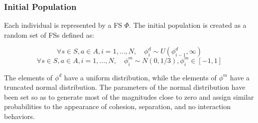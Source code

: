 \documentclass{llncs}
\begin{document}
\subsubsection{Initial Population}
\label{par:GA_Initial}
Each individual is represented by a FS $\Phi$. The initial population is created as a random set of FSs defined as:
\begin{small}
\begin{equation}
	\label{eq:init_dist}
	\forall s \in S, a \in A,  i = 1, \ldots, N, \quad \phi^d_i \sim U(\phi^d_{i-1},\infty)
\end{equation}
\begin{equation}
	\label{eq:init_magn}
	\forall s \in S, a \in A,  i = 1, \ldots, N, \quad \phi^m_i \sim N(0,1/3), \phi^m_i \in [-1,1]
\end{equation}
\end{small}
The elements of $\phi^d$ have a uniform distribution, while the elements of $\phi^m$ have a truncated normal distribution. The parameters of the normal distribution have been set so as to generate most of the magnitudes close to zero and assign similar probabilities to the appearance of cohesion, separation, and no interaction behaviors.
\end{document}

